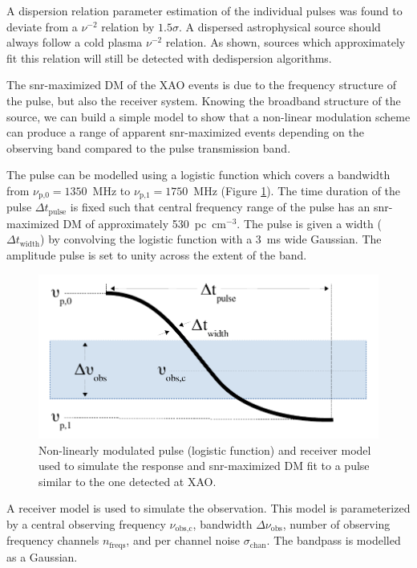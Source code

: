 \documentclass[a4paper,fleqn,usenatbib]{mnras}
\begin{document}
A dispersion relation parameter estimation of the individual pulses was found to
deviate from a $\nu^{-2}$ relation by $1.5 \sigma$. A dispersed astrophysical
source should always follow a cold plasma $\nu^{-2}$ relation. As shown, sources
which approximately fit this relation will still be detected with dedispersion
algorithms.

The \gls{snr}-maximized DM of the XAO events is due to the frequency structure
of the pulse, but also the receiver system.  Knowing the broadband structure of
the source, we can build a simple model to show that a non-linear modulation
scheme can produce a range of apparent \gls{snr}-maximized events depending on
the observing band compared to the pulse transmission band.

The pulse can be modelled using a logistic function which covers a bandwidth from
$\nu_{\textrm{p,0}} = 1350$~MHz to $\nu_{\textrm{p,1}} = 1750$~MHz (Figure
\ref{fig:xao_simulation_diagram}). The time duration of the pulse $\Delta
t_{\textrm{pulse}}$ is fixed such that central frequency range of the pulse has
an \gls{snr}-maximized DM of approximately 530~pc~cm$^{-3}$. The pulse is given
a width ($\Delta t_{\textrm{width}}$) by convolving the logistic function with a
3~ms wide Gaussian. The amplitude pulse is set to unity across the extent of the
band.

\begin{figure}
    \includegraphics[width=1.0\linewidth]{figures/simulation_diagram.pdf}
    \caption{Non-linearly modulated pulse (logistic function) and receiver model
    used to simulate the response and \gls{snr}-maximized DM fit to a pulse
    similar to the one detected at XAO.
    }
    \label{fig:xao_simulation_diagram}
\end{figure}

A receiver model is used to simulate the observation. This model is
parameterized by a central observing frequency $\nu_{\textrm{obs,c}}$, bandwidth
$\Delta \nu_{\textrm{obs}}$, number of observing frequency channels
$n_{\textrm{freqs}}$, and per channel noise $\sigma_{\textrm{chan}}$. The
bandpass is modelled as a Gaussian.
\end{document}
